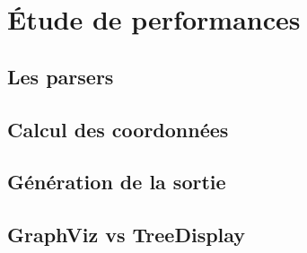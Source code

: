 \section{Étude de performances}

\subsection{Les parsers}

\subsection{Calcul des coordonnées}

\subsection{Génération de la sortie}

\subsection{GraphViz vs TreeDisplay}



